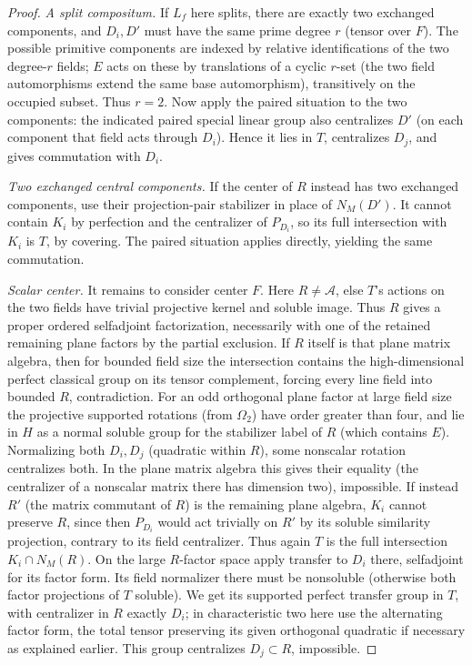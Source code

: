 \begin{proof}
\textit{A split compositum.} If \(L_f\) here splits, there are exactly two exchanged components, and \(D_i,D'\) must have the same prime degree \(r\) (tensor over \(F\)). The possible primitive components are indexed by relative identifications of the two degree-\(r\) fields; \(E\) acts on these by translations of a cyclic \(r\)-set (the two field automorphisms extend the same base automorphism), transitively on the occupied subset. Thus \(r=2\). Now apply the paired situation to the two components: the indicated paired special linear group also centralizes \(D'\) (on each component that field acts through \(D_i\)). Hence it lies in \(T\), centralizes \(D_j\), and gives commutation with \(D_i\).

\textit{Two exchanged central components.} If the center of \(R\) instead has two exchanged components, use their projection-pair stabilizer in place of \(N_M(D')\). It cannot contain \(K_i\) by perfection and the centralizer of \(P_{D_i}\), so its full intersection with \(K_i\) is \(T\), by covering. The paired situation applies directly, yielding the same commutation.

\textit{Scalar center.} It remains to consider center \(F\). Here \(R\ne\mathcal A\), else \(T\)'s actions on the two fields have trivial projective kernel and soluble image. Thus \(R\) gives a proper ordered selfadjoint factorization, necessarily with one of the retained remaining plane factors by the partial exclusion. If \(R\) itself is that plane matrix algebra, then for bounded field size the intersection contains the high-dimensional perfect classical group on its tensor complement, forcing every line field into bounded \(R\), contradiction. For an odd orthogonal plane factor at large field size the projective supported rotations (from \(\Omega_2\)) have order greater than four, and lie in \(H\) as a normal soluble group for the stabilizer label of \(R\) (which contains \(E\)). Normalizing both \(D_i,D_j\) (quadratic within \(R\)), some nonscalar rotation centralizes both. In the plane matrix algebra this gives their equality (the centralizer of a nonscalar matrix there has dimension two), impossible. If instead \(R'\) (the matrix commutant of \(R\)) is the remaining plane algebra, \(K_i\) cannot preserve \(R\), since then \(P_{D_i}\) would act trivially on \(R'\) by its soluble similarity projection, contrary to its field centralizer. Thus again \(T\) is the full intersection \(K_i\cap N_M(R)\). On the large \(R\)-factor space apply transfer to \(D_i\) there, selfadjoint for its factor form. Its field normalizer there must be nonsoluble (otherwise both factor projections of \(T\) soluble). We get its supported perfect transfer group in \(T\), with centralizer in \(R\) exactly \(D_i\); in characteristic two here use the alternating factor form, the total tensor preserving its given orthogonal quadratic if necessary as explained earlier. This group centralizes \(D_j\subset R\), impossible.


\end{proof}
